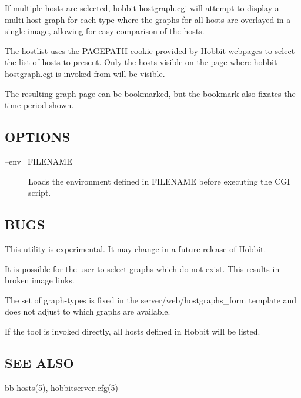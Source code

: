   If multiple hosts are selected, hobbit-hostgraph.cgi will attempt to
  display a multi-host graph for each type where the graphs for all
  hosts are overlayed in a single image, allowing for easy comparison
  of the hosts. 



  The hostlist uses the PAGEPATH cookie provided by Hobbit webpages to
  select the list of hosts to present. Only the hosts visible on the
  page where hobbit-hostgraph.cgi is invoked from will be visible. 



  The resulting graph page can be bookmarked, but the bookmark also fixates the time period shown. 


 
\subsection{OPTIONS}
\begin{description}
\item[--env=FILENAME] Loads the environment defined in FILENAME before executing the CGI script. 

 


\end{description}
\subsection{BUGS}
 This utility is experimental. It may change in a future release of Hobbit. 

  It is possible for the user to select graphs which do not exist. This results in broken image links. 


  The set of graph-types is fixed in the server/web/hostgraphs\_form template and does not adjust to which graphs are available. 


  If the tool is invoked directly, all hosts defined in Hobbit will be listed. 


 
\subsection{SEE ALSO}
bb-hosts(5), hobbitserver.cfg(5) 

 

%
%

